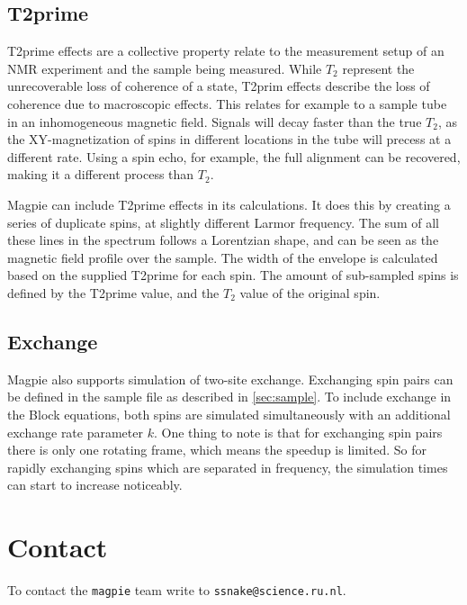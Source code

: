 \documentclass[11pt,a4paper]{article}
\begin{document}
\subsection{T2prime}
T2prime effects are a collective property relate to the measurement setup of an NMR experiment and the sample being measured.
While $T_2$ represent the unrecoverable loss of coherence of a state, T2prim effects describe the loss of coherence due to macroscopic effects.
This relates for example to a sample tube in an inhomogeneous magnetic field.
Signals will decay faster than the true $T_2$, as the XY-magnetization of spins in different locations in the tube will precess at a different rate.
Using a spin echo, for example, the full alignment can be recovered, making it a different process than $T_2$.

Magpie can include T2prime effects in its calculations.
It does this by creating a series of duplicate spins, at slightly different Larmor frequency.
The sum of all these lines in the spectrum follows a Lorentzian shape, and can be seen as the magnetic field profile over the sample.
The width of the envelope is calculated based on the supplied T2prime for each spin.
The amount of sub-sampled spins is defined by the T2prime value, and the $T_2$ value of the original spin.

\subsection{Exchange}
Magpie also supports simulation of two-site exchange.
Exchanging spin pairs can be defined in the sample file as described in \autoref{sec:sample}.
To include exchange in the Block equations, both spins are simulated simultaneously with an additional exchange rate parameter $k$.
One thing to note is that for exchanging spin pairs there is only one rotating frame, which means the speedup is limited.
So for rapidly exchanging spins which are separated in frequency, the simulation times can start to increase noticeably. 

\section{Contact}
To contact the \texttt{magpie} team write to \texttt{ssnake@science.ru.nl}.



\end{document}
